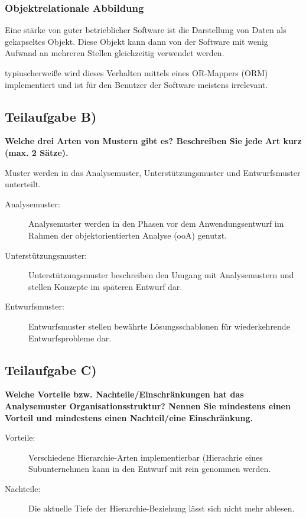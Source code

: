 \subsubsection{Objektrelationale Abbildung}
Eine stärke von guter betrieblicher Software ist die Darstellung von Daten als
gekapseltes Objekt. Diese Objekt kann dann von der Software mit wenig Aufwand an
mehreren Stellen gleichzeitig verwendet werden.

typiuscherweiße wird dieses Verhalten mittels eines OR-Mappers (ORM)
implementiert und ist für den Benutzer der Software meistens irrelevant.


\subsection{Teilaufgabe B)}
\textbf{Welche drei Arten von Mustern gibt es? Beschreiben Sie jede Art kurz
(max. 2 Sätze).}

Muster werden in das Analysemuster, Unterstützungsmuster und Entwurfsmuster
unterteilt.

\begin{description}
  \item[Analysemuster:]
  Analysemuster werden in den Phasen vor dem Anwendungsentwurf im Rahmen der
  objektorientierten Analyse (ooA) genutzt.
  
  \item[Unterstützungsmuster:] 
  Unterstützungsmuster beschreiben den Umgang mit
  Analysemustern und stellen Konzepte im späteren Entwurf dar.
  
  \item[Entwurfsmuster:] 
  Entwurfsmuster stellen bewährte Lösungsschablonen für wiederkehrende
  Entwurfsprobleme dar.
\end{description}

\subsection{Teilaufgabe C)}
\textbf{Welche Vorteile bzw. Nachteile/Einschränkungen hat das Analysemuster
Organisationsstruktur? Nennen Sie mindestens einen Vorteil und mindestens einen
Nachteil/eine Einschränkung.}

\begin{description}
  \item[Vorteile:] Verschiedene
  Hierarchie-Arten implementierbar (\zB Hierachrie eines Subunternehmen kann in
  den Entwurf mit rein genommen werden.
  
  \item[Nachteile:] Die aktuelle Tiefe der Hierarchie-Beziehung lässt sich nicht
  mehr ablesen.
\end{description}

